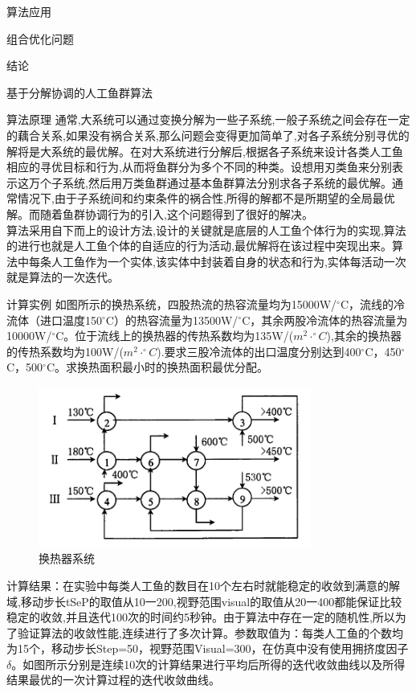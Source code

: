 \documentclass[UTF8]{ctexart}
\begin{document}
\begin{section}{算法应用}
\begin{subsection}{组合优化问题}
\begin{subsubsection}{结论}
\end{subsubsection}
\end{subsection}
\begin{subsection}{基于分解协调的人工鱼群算法}
\begin{subsubsection}{算法原理}
通常,大系统可以通过变换分解为一些子系统,一般子系统之间会存在一定的藕合关系,如果没有祸合关系,那么问题会变得更加简单了,对各子系统分别寻优的解将是大系统的最优解。在对大系统进行分解后,根据各子系统来设计各类人工鱼相应的寻优目标和行为,从而将鱼群分为多个不同的种类。设想用刃类鱼来分别表示这万个子系统,然后用万类鱼群通过基本鱼群算法分别求各子系统的最优解。通常情况下,由于子系统间和约束条件的祸合性,所得的解都不是所期望的全局最优解。而随着鱼群协调行为的引入,这个问题得到了很好的解决。\\
\indent 算法采用自下而上的设计方法,设计的关键就是底层的人工鱼个体行为的实现,算法的进行也就是人工鱼个体的自适应的行为活动,最优解将在该过程中突现出来。算法中每条人工鱼作为一个实体,该实体中封装着自身的状态和行为,实体每活动一次就是算法的一次迭代。
\end{subsubsection}
\begin{subsubsection}{计算实例}
如图所示的换热系统，四股热流的热容流量均为15000W/$^{\circ}$C，流线\uppercase\expandafter{}的冷流体（进口温度150$^{\circ}$C）的热容流量为13500W/$^{\circ}$C，其余两股冷流体的热容流量为10000W/$^{\circ}$C。位于流线\uppercase\expandafter{}上的换热器的传热系数均为135W/($m^2\cdot ^{\circ}C $),其余的换热器的传热系数均为100W/($m^2\cdot ^{\circ}C $).要求三股冷流体的出口温度分别达到400$^{\circ}$C，450$^{\circ}$C，500$^{\circ}$C。求换热面积最小时的换热面积最优分配。
\begin{figure}[H]
\centering
\includegraphics[width=0.8\textwidth]{../../pic/fish15.png}
\caption{换热器系统}
\end{figure}
计算结果：在实验中每类人工鱼的数目在10个左右时就能稳定的收敛到满意的解域,移动步长tSeP的取值从10一200,视野范围visual的取值从20一400都能保证比较稳定的收敛,并且迭代100次的时间约5秒钟。由于算法中存在一定的随机性,所以为了验证算法的收敛性能,连续进行了多次计算。参数取值为：每类人工鱼的个数均为15个，移动步长Step=50，视野范围Visual=300，在仿真中没有使用拥挤度因子$\delta$。如图所示分别是连续10次的计算结果进行平均后所得的迭代收敛曲线以及所得结果最优的一次计算过程的迭代收敛曲线。


\end{subsubsection}
\end{subsection}
\end{section}
\end{document}
